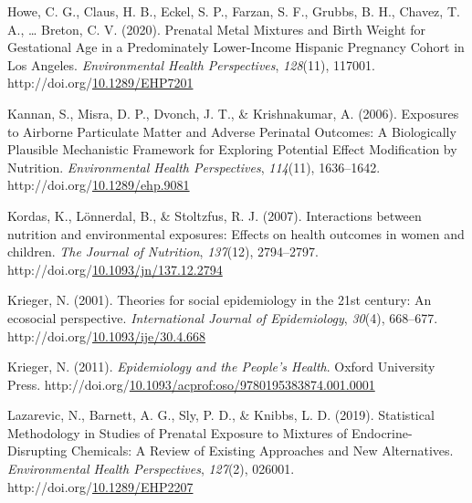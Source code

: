 \documentclass[12pt, twoside]{amherstthesis}
\newenvironment{CSLReferences}[2]%
  {}%
  {\par}
\begin{document}
\begin{CSLReferences}{1}{0}
\leavevmode{}%
Howe, C. G., Claus, H. B., Eckel, S. P., Farzan, S. F., Grubbs, B. H., Chavez, T. A., \ldots{} Breton, C. V. (2020). Prenatal {Metal} {Mixtures} and {Birth} {Weight} for {Gestational} {Age} in a {Predominately} {Lower}-{Income} {Hispanic} {Pregnancy} {Cohort} in {Los} {Angeles}. \emph{Environmental Health Perspectives}, \emph{128}(11), 117001. http://doi.org/\href{https://doi.org/10.1289/EHP7201}{10.1289/EHP7201}

\leavevmode{}%
Kannan, S., Misra, D. P., Dvonch, J. T., \& Krishnakumar, A. (2006). Exposures to {Airborne} {Particulate} {Matter} and {Adverse} {Perinatal} {Outcomes}: {A} {Biologically} {Plausible} {Mechanistic} {Framework} for {Exploring} {Potential} {Effect} {Modification} by {Nutrition}. \emph{Environmental Health Perspectives}, \emph{114}(11), 1636--1642. http://doi.org/\href{https://doi.org/10.1289/ehp.9081}{10.1289/ehp.9081}

\leavevmode{}%
Kordas, K., Lönnerdal, B., \& Stoltzfus, R. J. (2007). Interactions between nutrition and environmental exposures: Effects on health outcomes in women and children. \emph{The Journal of Nutrition}, \emph{137}(12), 2794--2797. http://doi.org/\href{https://doi.org/10.1093/jn/137.12.2794}{10.1093/jn/137.12.2794}

\leavevmode{}%
Krieger, N. (2001). Theories for social epidemiology in the 21st century: An ecosocial perspective. \emph{International Journal of Epidemiology}, \emph{30}(4), 668--677. http://doi.org/\href{https://doi.org/10.1093/ije/30.4.668}{10.1093/ije/30.4.668}

\leavevmode{}%
Krieger, N. (2011). \emph{Epidemiology and the {People}'s {Health}}. Oxford University Press. http://doi.org/\href{https://doi.org/10.1093/acprof:oso/9780195383874.001.0001}{10.1093/acprof:oso/9780195383874.001.0001}

\leavevmode{}%
Lazarevic, N., Barnett, A. G., Sly, P. D., \& Knibbs, L. D. (2019). Statistical {Methodology} in {Studies} of {Prenatal} {Exposure} to {Mixtures} of {Endocrine}-{Disrupting} {Chemicals}: {A} {Review} of {Existing} {Approaches} and {New} {Alternatives}. \emph{Environmental Health Perspectives}, \emph{127}(2), 026001. http://doi.org/\href{https://doi.org/10.1289/EHP2207}{10.1289/EHP2207}


\end{CSLReferences}
\end{document}
